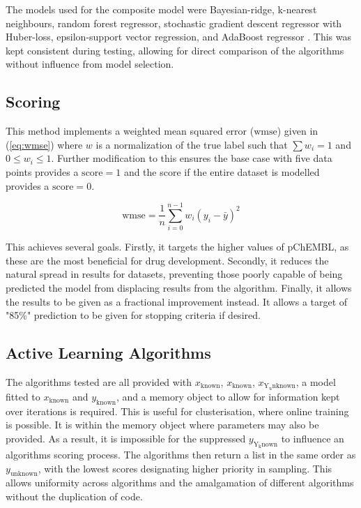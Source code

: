 The models used for the composite model were Bayesian-ridge, k-nearest neighbours, random forest regressor, stochastic gradient descent regressor with Huber-loss, epsilon-support vector regression, and AdaBoost regressor \cite{scikit}. This was kept consistent during testing, allowing for direct comparison of the algorithms without influence from model selection.

\subsection{Scoring}
This method implements a weighted mean squared error ($\mathrm{wmse}$) given in (\ref{eq:wmse}) where $w$ is a normalization of the true label such that $\sum{w_i}=1$ and ${0\leq{}w_i\leq{}1}$. Further modification to this ensures the base case with five data points provides a $\mathrm{score}=1$ and the score if the entire dataset is modelled provides a $\mathrm{score}=0$.

\begin{equation}
    \mathrm{wmse}=\frac{1}{n}\sum_{i=0}^{n-1}{w_i(y_i-\bar{y})^2}
    \label{eq:wmse}
\end{equation}

This achieves several goals. Firstly, it targets the higher values of pChEMBL, as these are the most beneficial for drug development. Secondly, it reduces the natural spread in results for datasets, preventing those poorly capable of being predicted the model from displacing results from the algorithm. Finally, it allows the results to be given as a fractional improvement instead. It allows a target of "85\%" prediction to be given for stopping criteria if desired.

\subsection{Active Learning Algorithms}
The algorithms tested are all provided with $x_\mathrm{known}$, $x_\mathrm{known}$, $x_\mathrm{Y_unknown}$, a model fitted to $x_\mathrm{known}$ and $y_\mathrm{known}$, and a memory object to allow for information kept over iterations is required. This is useful for clusterisation, where online training is possible. It is within the memory object where parameters may also be provided. As a result, it is impossible for the suppressed $y_\mathrm{Y_known}$ to influence an algorithms scoring process. The algorithms then return a list in the same order as $y_\mathrm{unknown}$, with the lowest scores designating higher priority in sampling. This allows uniformity across algorithms and the amalgamation of different algorithms without the duplication of code.

